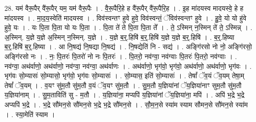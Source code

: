 \documentclass[17pt]{extarticle}
\begin{document}
28. यम॑ वैरू॒पैर् वै॑रू॒पैर् यम॒ यम॑ वैरू॒पैः । . वै॒रू॒पैरि॒हे ह वै॑रू॒पैर् वै॑रू॒पैरि॒ह । . इ॒ह मा॑दयस्व मादयस्वे॒ हे ह मा॑दयस्व । . मा॒द॒य॒स्वेति॑ मादयस्व । . विव॑स्वन्तꣳ हुवे हुवे॒ विव॑स्वन्तं॒ ॅविव॑स्वन्तꣳ हुवे । . हु॒वे॒ यो यो हु॑वे हुवे॒ यः । . यः पि॒ता पि॒ता यो यः पि॒ता । . पि॒ता ते॑ ते पि॒ता पि॒ता ते᳚ । . ते॒ ऽस्मिन् न॒स्मिन् ते॑ ते॒ ऽस्मिन्न् । . अ॒स्मिन्. य॒ज्ञे य॒ज्ञे अ॒स्मिन् न॒स्मिन्. य॒ज्ञे । . य॒ज्ञे ब॒र्॒.हिषि॑ ब॒र्॒.हिषि॑ य॒ज्ञे य॒ज्ञे ब॒र्॒.हिषि॑ । . ब॒र्॒.हिष्या ब॒र्॒.हिषि॑ ब॒र्॒.हिष्या । . आ नि॒षद्य॑ नि॒षद्या नि॒षद्य॑ । . नि॒षद्येति॑ नि - सद्य॑ । . अङ्गि॑रसो नो नो॒ अङ्गि॑रसो॒ अङ्गि॑रसो नः । . नः॒ पि॒तरः॑ पि॒तरो॑ नो नः पि॒तरः॑ । . पि॒तरो॒ नव॑ग्वा॒ नव॑ग्वाः पि॒तरः॑ पि॒तरो॒ नव॑ग्वाः । . नव॑ग्वा॒ अथ॑र्वाणो॒ अथ॑र्वाणो॒ नव॑ग्वा॒ नव॑ग्वा॒ अथ॑र्वाणः । . अथ॑र्वाणो॒ भृग॑वो॒ भृग॑वो॒ अथ॑र्वाणो॒ अथ॑र्वाणो॒ भृग॑वः । . भृग॑वः सो॒म्यासः॑ सो॒म्यासो॒ भृग॑वो॒ भृग॑वः सो॒म्यासः॑ । . सो॒म्यास॒ इति॑ सो॒म्यासः॑ । . तेषां᳚ ॅव॒यं ॅव॒यम् तेषा॒म् तेषां᳚ ॅव॒यम् । . व॒यꣳ सु॑म॒तौ सु॑म॒तौ व॒यं ॅव॒यꣳ सु॑म॒तौ । . सु॒म॒तौ य॒ज्ञिया॑नां ॅय॒ज्ञिया॑नाꣳ सुम॒तौ सु॑म॒तौ य॒ज्ञिया॑नाम् । . सु॒म॒ताविति॑ सु - म॒तौ । . य॒ज्ञिया॑ना॒ मप्यपि॑ य॒ज्ञिया॑नां ॅय॒ज्ञिया॑ना॒ मपि॑ । . अपि॑ भ॒द्रे भ॒द्रे अप्यपि॑ भ॒द्रे । . भ॒द्रे सौ॑मन॒से सौ॑मन॒से भ॒द्रे भ॒द्रे सौ॑मन॒से । . सौ॒म॒न॒से स्या॑म स्याम सौमन॒से सौ॑मन॒से स्या॑म । . स्या॒मेति॑ स्याम । \newline
\end{document}
